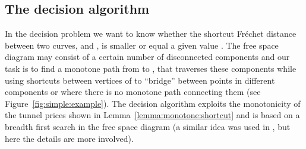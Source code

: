 \documentclass[12pt]{article}
\newcommand{\seclab}[1]{\label{sec:#1}}
\newcommand{\lemref}[1]{Lemma~\ref{lemma:#1}}
\newcommand{\figref}[1]{Figure~\ref{fig:#1}}
\newcommand{\Frechet}{Fr\'{e}c{h}e{}t\xspace}\providecommand{\Arr}{\mathop{\mathrm{\EuScript{A}}}}
\numberwithin{figure}{section}
\numberwithin{equation}{section}
\begin{document}
\subsection{The decision algorithm}
\seclab{algo:decider}

In the decision problem we want to know whether the shortcut \Frechet
distance between two curves,  and , is smaller or equal a
given value .  The free space diagram
 may consist of a certain number of
disconnected components and our task is to find a monotone path from
 to , that traverses these components while using
shortcuts between vertices of  to ``bridge'' between points in
different components or where there is no monotone path connecting
them (see \figref{simple:example}).  The decision algorithm exploits
the monotonicity of the tunnel prices shown in
\lemref{monotone:shortcut} and is based on a breadth first search in
the free space diagram (a similar idea was used
in \cite{dhw-afdrc-12}, but here the details are more involved).
\end{document}
